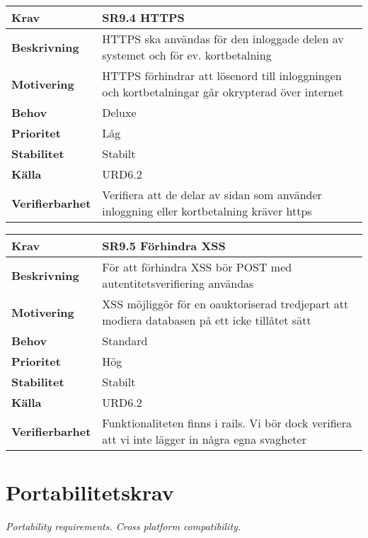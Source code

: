 \documentclass[a4paper, twoside, 11pt, titlepage]{article}
\begin{document}
\begin{tabular} { p{2.6cm} p{12.5cm} }
	\hline
	\sffamily\textbf{Krav} & SR9.4 HTTPS   \\
	\hline
	\sffamily\textbf{Beskrivning} & HTTPS ska användas för den inloggade delen av systemet och för ev. kortbetalning  \\
	\hline
	\sffamily\textbf{Motivering} & HTTPS förhindrar att lösenord till inloggningen och kortbetalningar går okrypterad över internet  \\
	\hline
	\sffamily\textbf{Behov} & Deluxe  \\
	\hline
	\sffamily\textbf{Prioritet} & Låg  \\
	\hline
	\sffamily\textbf{Stabilitet} & Stabilt  \\
	\hline
	\sffamily\textbf{Källa} & URD6.2  \\
	\hline
	\sffamily\textbf{Verifierbarhet} & Verifiera att de delar av sidan som använder inloggning eller kortbetalning kräver https  \\
	\hline
\end{tabular}
\vspace{6mm}

\begin{tabular} { p{2.6cm} p{12.5cm} }
	\hline
	\sffamily\textbf{Krav} & SR9.5 Förhindra XSS   \\
	\hline
	\sffamily\textbf{Beskrivning} & För att förhindra XSS bör POST med autentitetsverifiering användas  \\
	\hline
	\sffamily\textbf{Motivering} & XSS möjliggör för en oauktoriserad tredjepart att modiera databasen på ett icke tillåtet sätt  \\
	\hline
	\sffamily\textbf{Behov} & Standard  \\
	\hline
	\sffamily\textbf{Prioritet} & Hög  \\
	\hline
	\sffamily\textbf{Stabilitet} & Stabilt  \\
	\hline
	\sffamily\textbf{Källa} & URD6.2  \\
	\hline
	\sffamily\textbf{Verifierbarhet} & Funktionaliteten finns i rails. Vi bör dock verifiera att vi inte lägger in några egna svagheter  \\
	\hline
\end{tabular}


\clearpage
\section{Portabilitetskrav}


\emph{Portability requirements. Cross platform compatibility.}
\end{document}
